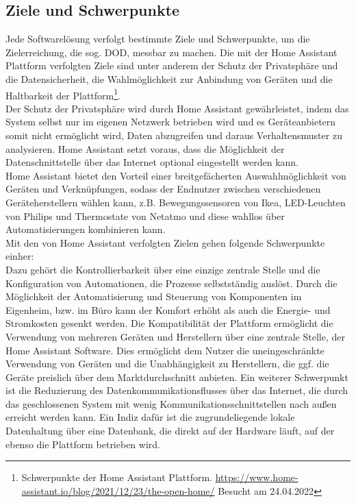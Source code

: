 \subsection{Ziele und Schwerpunkte}
    Jede Softwarelösung verfolgt bestimmte Ziele und Schwerpunkte, um die Zielerreichung, die sog. \ac{DOD}, messbar zu machen. Die mit 
    der Home Assistant Plattform verfolgten Ziele sind unter anderem der Schutz der Privatsphäre und die Datensicherheit, die Wahlmöglichkeit zur Anbindung von 
    Geräten und die Haltbarkeit der Plattform\footnote{Schwerpunkte der Home Assistant Plattform. \url{https://www.home-assistant.io/blog/2021/12/23/the-open-home/} Besucht am 24.04.2022}. 
    \\
    \linebreak
    Der Schutz der Privatsphäre wird durch Home Assistant gewährleistet, indem das System selbst nur im eigenen Netzwerk betrieben wird und es 
    Geräteanbietern somit nicht ermöglicht wird, Daten abzugreifen und daraus Verhaltensmuster zu analysieren. Home Assistant setzt voraus, dass die 
    Möglichkeit der Datenschnittstelle über das Internet optional eingestellt werden kann. 
    \\
    Home Assistant bietet den Vorteil einer breitgefächerten Auswahlmöglichkeit von Geräten und Verknüpfungen, sodass der Endnutzer zwischen verschiedenen 
    Geräteherstellern wählen kann, z.B. Bewegungssensoren von Ikea, LED-Leuchten von Philips und Thermostate von Netatmo und diese wahllos über 
    Automatisierungen kombinieren kann. 
    \\
    Mit den von Home Assistant verfolgten Zielen gehen folgende Schwerpunkte einher:
    \\
    \linebreak
    Dazu gehört die Kontrollierbarkeit über eine einzige zentrale Stelle und die Konfiguration von 
    Automationen, die Prozesse selbstständig auslöst. Durch die Möglichkeit der Automatisierung und Steuerung von Komponenten im Eigenheim, 
    bzw. im Büro kann der Komfort erhöht als auch die Energie- und Stromkosten gesenkt werden. Die Kompatibilität der Plattform 
    ermöglicht die Verwendung von mehreren Geräten und Herstellern über eine zentrale Stelle, der Home Assistant Software. Dies ermöglicht 
    dem Nutzer die uneingeschränkte Verwendung von Geräten und die Unabhängigkeit zu Herstellern, die ggf. die Geräte preislich über dem 
    Marktdurchschnitt anbieten. Ein weiterer Schwerpunkt ist die Reduzierung des Datenkommunikationsflusses über das Internet, die durch das 
    geschlossenen System mit wenig Kommunikationsschnittstellen nach außen erreicht werden kann. Ein Indiz dafür ist die zugrundeliegende 
    lokale Datenhaltung über eine Datenbank, die direkt auf der Hardware läuft, auf der ebenso die Plattform betrieben wird. 

